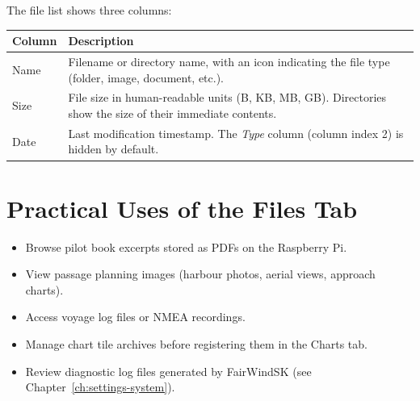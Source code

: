 The file list shows three columns:

\begin{longtable}{L{2cm} L{11.7cm}}
\toprule
{}
{\sffamily\bfseries\color{white} Column} &
{\sffamily\bfseries\color{white} Description} \\
\midrule
Name & Filename or directory name, with an icon indicating the file type (folder, image, document, etc.). \\
Size & File size in human-readable units (B, KB, MB, GB). Directories show the size of their immediate contents. \\
Date & Last modification timestamp. The \textit{Type} column (column index 2) is hidden by default. \\
\bottomrule
\end{longtable}

\section{Practical Uses of the Files Tab}

\begin{itemize}
  \item Browse pilot book excerpts stored as PDFs on the Raspberry Pi.
  \item View passage planning images (harbour photos, aerial views, approach charts).
  \item Access voyage log files or NMEA recordings.
  \item Manage chart tile archives before registering them in the Charts tab.
  \item Review diagnostic log files generated by FairWindSK (see Chapter~\ref{ch:settings-system}).
\end{itemize}
